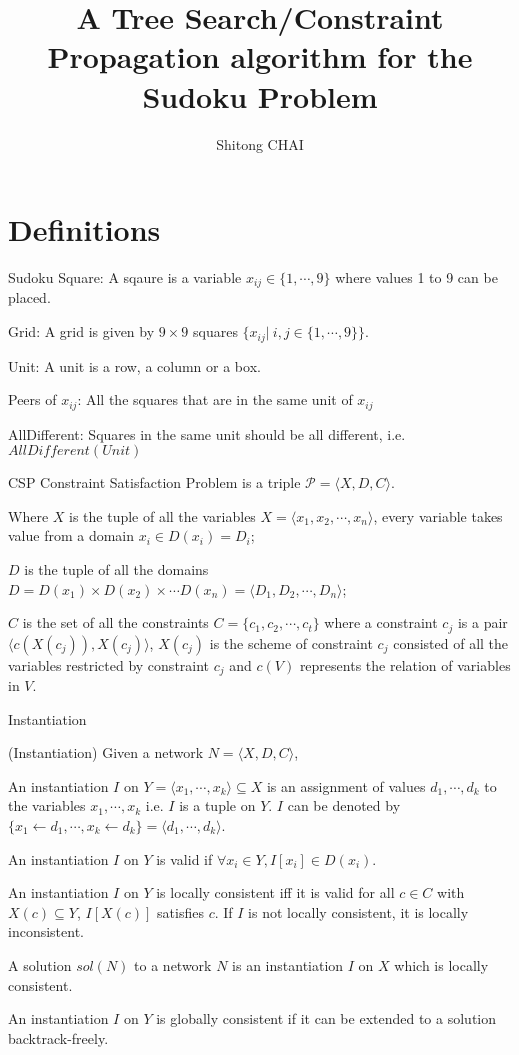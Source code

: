 \documentclass[10pt,aspectratio=43,mathserif]{beamer}
\title{A Tree Search/Constraint Propagation algorithm for the Sudoku Problem}
\date{}
\author{Shitong CHAI}
\institute{ISIMA}
\begin{document}
\frame{\titlepage}

\section{Definitions}
    \begin{frame}{Sudoku}
    Square: A sqaure is a variable $x_{ij}\in\{1,\cdots,9\}$ where values 1 to 9 can be placed.

    Grid: A grid is given by $9\times 9$ squares $\{x_{ij}|\ i,j\in\{1,\cdots,9\}\}$.

    Unit: A unit is a row, a column or a box.

    Peers of $x_{ij}$: All the squares that are in the same unit of $x_{ij}$

    AllDifferent: Squares in the same unit should be all different, i.e. $AllDifferent(Unit)$
\end{frame}

\begin{frame}{CSP}
    Constraint Satisfaction Problem is a triple $\mathcal P=\langle X, D, C\rangle$. 

    Where $X$ is the tuple of all the variables $X=\langle x_1,x_2,\cdots,x_n\rangle$, every variable takes value from a domain $x_i\in D(x_i)=D_i$;

    $D$ is the tuple of all the domains $D=D(x_1)\times D(x_2)\times \cdots D(x_n)=\langle D_1,D_2,\cdots,D_n\rangle$; 

    $C$ is the set of all the constraints $C=\{c_1,c_2,\cdots,c_t\}$ where a constraint $c_j$ is a pair $\langle c(X(c_j)),
            X(c_j)\rangle$, $X(c_j)$ is the scheme of constraint $c_j$ consisted of all the variables restricted by constraint $c_j$ and $c(V)$ represents the relation of variables in $V$.
\end{frame}

\begin{frame}{Instantiation}
            \begin{definition}
                (Instantiation) Given a network $N=\langle X,D,C\rangle$,

                An instantiation $I$ on $Y=\langle x_1,\cdots,x_k\rangle \subseteq X$ is an assignment of values $d_1,\cdots, d_k$ to the variables $x_1, \cdots, x_k$ i.e. $I$ is a tuple on $Y$. $I$ can be denoted by $\{x_1\gets d_1, \cdots, x_k\gets d_k\}=\langle d_1, \cdots, d_k\rangle$.

                An instantiation $I$ on $Y$ is valid if $\forall x_i\in Y, I[x_i]\in D(x_i)$.

                An instantiation $I$ on $Y$ is locally consistent iff it is valid for all $c\in C$ with $X(c)\subseteq Y$, $I[X(c)]$ satisfies $c$. If $I$ is not locally consistent, it is locally inconsistent.

                A solution $sol(N)$ to a network $N$ is an instantiation $I$ on $X$ which is locally consistent. 

                An instantiation $I$ on $Y$ is globally consistent if it can be extended to a solution backtrack-freely.
            \end{definition}
\end{frame}
\end{document}

